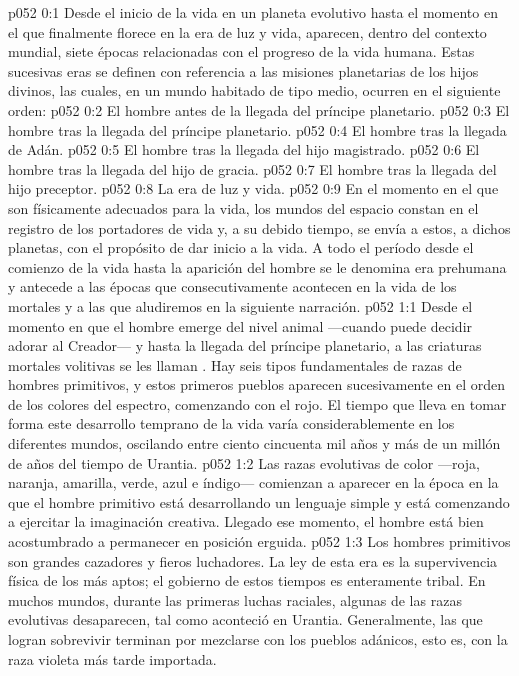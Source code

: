 \author{Mensajero poderoso}
\vs p052 0:1 Desde el inicio de la vida en un planeta evolutivo hasta el momento en el que finalmente florece en la era de luz y vida, aparecen, dentro del contexto mundial, siete épocas relacionadas con el progreso de la vida humana. Estas sucesivas eras se definen con referencia a las misiones planetarias de los hijos divinos, las cuales, en un mundo habitado de tipo medio, ocurren en el siguiente orden:
\vs p052 0:2 El hombre antes de la llegada del príncipe planetario.
\vs p052 0:3 El hombre tras la llegada del príncipe planetario.
\vs p052 0:4 El hombre tras la llegada de Adán.
\vs p052 0:5 El hombre tras la llegada del hijo magistrado.
\vs p052 0:6 El hombre tras la llegada del hijo de gracia.
\vs p052 0:7 El hombre tras la llegada del hijo preceptor.
\vs p052 0:8 La era de luz y vida.
\vs p052 0:9 \pc En el momento en el que son físicamente adecuados para la vida, los mundos del espacio constan en el registro de los portadores de vida y, a su debido tiempo, se envía a estos, a dichos planetas, con el propósito de dar inicio a la vida. A todo el período desde el comienzo de la vida hasta la aparición del hombre se le denomina era prehumana y antecede a las épocas que consecutivamente acontecen en la vida de los mortales y a las que aludiremos en la siguiente narración.
\vs p052 1:1 Desde el momento en que el hombre emerge del nivel animal ---cuando puede decidir adorar al Creador--- y hasta la llegada del príncipe planetario, a las criaturas mortales volitivas se les llaman . Hay seis tipos fundamentales de razas de hombres primitivos, y estos primeros pueblos aparecen sucesivamente en el orden de los colores del espectro, comenzando con el rojo. El tiempo que lleva en tomar forma este desarrollo temprano de la vida varía considerablemente en los diferentes mundos, oscilando entre ciento cincuenta mil años y más de un millón de años del tiempo de Urantia.
\vs p052 1:2 Las razas evolutivas de color ---roja, naranja, amarilla, verde, azul e índigo--- comienzan a aparecer en la época en la que el hombre primitivo está desarrollando un lenguaje simple y está comenzando a ejercitar la imaginación creativa. Llegado ese momento, el hombre está bien acostumbrado a permanecer en posición erguida.
\vs p052 1:3 \pc Los hombres primitivos son grandes cazadores y fieros luchadores. La ley de esta era es la supervivencia física de los más aptos; el gobierno de estos tiempos es enteramente tribal. En muchos mundos, durante las primeras luchas raciales, algunas de las razas evolutivas desaparecen, tal como aconteció en Urantia. Generalmente, las que logran sobrevivir terminan por mezclarse con los pueblos adánicos, esto es, con la raza violeta más tarde importada.
